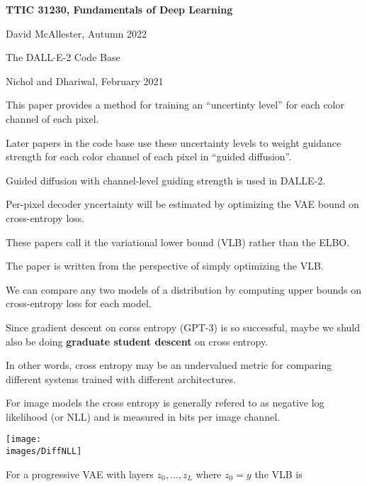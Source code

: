





{\Huge

  \centerline{\bf TTIC 31230, Fundamentals of Deep Learning}
  \bigskip
  \centerline{David McAllester, Autumn 2022}
  \vfill
  \vfil
  \centerline{The DALL$\cdot$E-2 Code Base}
  \vfill
  \vfill

{Nichol and Dhariwal, February 2021}

\vfill
This paper provides a method for training an ``uncertinty level'' for each color channel of each pixel.

\vfill
Later papers in the code base use these uncertainty levels to weight guidance strength for each color channel of each pixel in ``guided diffusion''.

\vfill
Guided diffusion with channel-level guiding strength is used in DALLE-2.


Per-pixel decoder yncertainty will be estimated by optimizing the VAE bound on cross-entropy loss.

\vfill
These papers call it the variational lower bound (VLB) rather than the ELBO.

\vfill
The paper is written from the perspective of simply optimizing the VLB.


We can compare any two models of a distribution by computing upper bounds on cross-entropy loss for each model.

\vfill
Since gradient descent on corss entropy (GPT-3) is so successful, maybe we shuld also be doing {\bf graduate student descent} on cross entropy.

\vfill
In other words, cross entropy may be an undervalued metric for comparing different systems trained with different architectures.



For image models the cross entropy is generally refered to as negative log likelihood (or NLL) and is measured in bits per image channel.

\centerline{\texttt{[image: \\images/DiffNLL]}}


For a progressive VAE with layers $z_0,\ldots,z_L$ where $z_0 = y$ the VLB is

}
